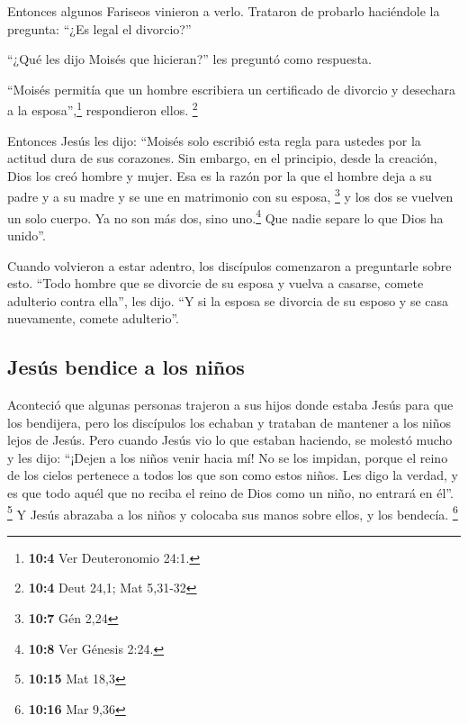  Entonces algunos Fariseos vinieron a verlo. Trataron de
probarlo haciéndole la pregunta: ``¿Es legal el divorcio?''

 ``¿Qué les dijo Moisés que hicieran?'' les preguntó como
respuesta.

 ``Moisés permitía que un hombre escribiera un certificado
de divorcio y desechara a la esposa'',\footnote{\textbf{10:4} Ver
  Deuteronomio 24:1.} respondieron ellos. \footnote{\textbf{10:4} Deut
  24,1; Mat 5,31-32}

 Entonces Jesús les dijo: ``Moisés solo escribió esta
regla para ustedes por la actitud dura de sus corazones. 
Sin embargo, en el principio, desde la creación, Dios los creó hombre y
mujer.  Esa es la razón por la que el hombre deja a su
padre y a su madre y se une en matrimonio con su esposa, \footnote{\textbf{10:7}
  Gén 2,24}  y los dos se vuelven un solo cuerpo. Ya no
son más dos, sino uno.\footnote{\textbf{10:8} Ver Génesis 2:24.}
 Que nadie separe lo que Dios ha unido''.

 Cuando volvieron a estar adentro, los discípulos
comenzaron a preguntarle sobre esto.  ``Todo hombre que
se divorcie de su esposa y vuelva a casarse, comete adulterio contra
ella'', les dijo.  ``Y si la esposa se divorcia de su
esposo y se casa nuevamente, comete adulterio''.

\hypertarget{jesuxfas-bendice-a-los-niuxf1os}{%
\subsection{Jesús bendice a los
niños}\label{jesuxfas-bendice-a-los-niuxf1os}}

 Aconteció que algunas personas trajeron a sus hijos
donde estaba Jesús para que los bendijera, pero los discípulos los
echaban y trataban de mantener a los niños lejos de Jesús.
 Pero cuando Jesús vio lo que estaban haciendo, se
molestó mucho y les dijo: ``¡Dejen a los niños venir hacia mí! No se los
impidan, porque el reino de los cielos pertenece a todos los que son
como estos niños.  Les digo la verdad, y es que todo
aquél que no reciba el reino de Dios como un niño, no entrará en él''.
\footnote{\textbf{10:15} Mat 18,3}  Y Jesús abrazaba a
los niños y colocaba sus manos sobre ellos, y los bendecía. \footnote{\textbf{10:16}
  Mar 9,36}

